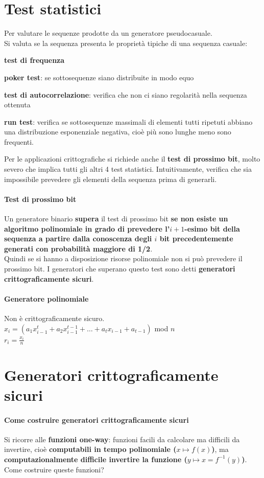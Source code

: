 \documentclass[10pt]{book}
\begin{document}
\section{Test statistici}
Per valutare le sequenze prodotte da un generatore pseudocasuale.\\
Si valuta se la sequenza presenta le proprietà tipiche di una sequenza casuale:
\begin{list}{}{}
	\item \textbf{test di frequenza}
	\item \textbf{poker test}: se sottosequenze siano distribuite in modo equo
	\item \textbf{test di autocorrelazione}: verifica che non ci siano regolarità nella sequenza ottenuta
	\item \textbf{run test}: verifica se sottosequenze massimali di elementi tutti ripetuti abbiano una distribuzione esponenziale negativa, cioè più sono lunghe meno sono frequenti.
\end{list}
Per le applicazioni crittografiche si richiede anche il \textbf{test di prossimo bit}, molto severo che implica tutti gli altri 4 test statistici. Intuitivamente, verifica che sia impossibile prevedere gli elementi della sequenza prima di generarli.
\paragraph{Test di prossimo bit} Un generatore binario \textbf{supera} il test di prossimo bit \textbf{se non esiste un algoritmo polinomiale in grado di prevedere l'$i+1$-esimo bit della sequenza a partire dalla conoscenza degli $i$ bit precedentemente generati con probabilità maggiore di 1/2}.\\
Quindi se si hanno a disposizione risorse polinomiale non si può prevedere il prossimo bit. I generatori che superano questo test sono detti \textbf{generatori crittograficamente sicuri}.
\paragraph{Generatore polinomiale} Non è crittograficamente sicuro.\\
$x_i = (a_1 x_{i-1}^t + a_2 x_{i-1}^{t-1} + \ldots + a_t x_{i-1} + a_{t-1})$ mod $n$\\
$r_i = \frac{x_i}{n}$
\section{Generatori crittograficamente sicuri}
\paragraph{Come costruire generatori crittograficamente sicuri}
Si ricorre alle \textbf{funzioni one-way}: funzioni facili da calcolare ma difficili da invertire, cioè \textbf{computabili in tempo polinomiale ($x\mapsto f(x)$)}, ma \textbf{computazionalmente difficile invertire la funzione ($y\mapsto x=f^{-1}(y)$)}. Come costruire queste funzioni?
\end{document}
